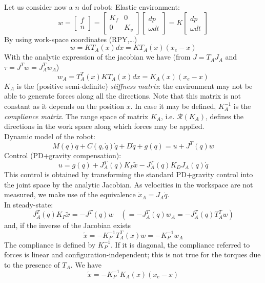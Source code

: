 \documentclass{book}
\begin{document}
Let us consider now a $n$ dof robot: Elastic environment:
\[
    w=\begin{bmatrix}
        f \\ n
    \end{bmatrix}= \begin{bmatrix}
    K_f & 0 \\ 0 & K_v
    \end{bmatrix}\begin{bmatrix}
        dp \\ \omega dt
    \end{bmatrix} = K\begin{bmatrix}
        dp \\ \omega dt
    \end{bmatrix}
\]
By using work-space coordinates (RPY,\dots)
\[
    w = KT_A(x)dx = KT_A(x)(x_e-x)
\]
With the analytic expression of the jacobian we have (from $J=T_AJ_A$ and $\tau=J^Tw=J_A^Tw_A$)
\[
    w_A=T_A^T(x)KT_A(x)dx=K_A(x)(x_e-x)
\]
$K_A$ is the (positive semi-definite) \emph{stiffness matrix}: the environment may not be able to generate forces along all the directions. Note that this matrix is not constant as it depends on the position $x$. In case it may be defined, $K_A^{-1}$ is the \emph{compliance matrix}. The range space of matrix $K_A$, i.e. $\mathcal{R}(K_A)$, defines the directions in the work space along which forces may be applied. \\
Dynamic model of the robot: 
\[M(q)\ddot{q}+C(q,\dot{q})\dot{q}+D\dot{q}+g(q)=u+J^T(q)w\] 
Control (PD+gravity compensation): 
\[u=g(q)+J_A^T(q)K_P\tilde{x}-J_A^T(q)K_DJ_A(q)\dot{q}\]
This control is obtained by transforming the standard PD+gravity control into the joint space by the analytic Jacobian. As velocities in the workspace are not measured, we make use of the equivalence $\dot{x}_A=J_A\dot{q}$.\\
In steady-state:
\[
    J_A^T(q)K_P\tilde{x}=-J^T(q)w \quad (=-J_A^T(q)w_A=-J_A^T(q)T_A^Tw)
\]
and, if the inverse of the Jacobian exists
\[
    \tilde{x}=-K_P^{-1}T_A^T(x)w = -K_P^{-1}w_A
\]
The compliance is defined by $K_P^{-1}$. If it is diagonal, the compliance referred to forces is linear and configuration-independent; this is not true for the torques due to the presence of $T_A$. 
We have
\[
    \tilde{x}=-K_P^{-1}K_A(x)(x_e-x)
\]
\end{document}
